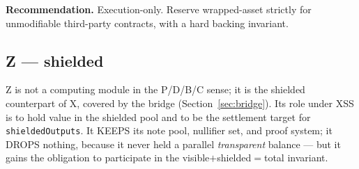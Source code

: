 \textbf{Recommendation.} Execution-only. Reserve wrapped-asset strictly
for unmodifiable third-party contracts, with a hard backing invariant.

\subsection{Z --- shielded}

Z is not a computing module in the P/D/B/C sense; it is the shielded
counterpart of X, covered by the bridge (Section~\ref{sec:bridge}). Its
role under XSS is to hold value in the shielded pool and to be the
settlement target for \texttt{shieldedOutputs}. It KEEPS its note pool,
nullifier set, and proof system; it DROPS nothing, because it never held
a parallel \emph{transparent} balance --- but it gains the obligation to
participate in the visible$+$shielded$=$total invariant.
